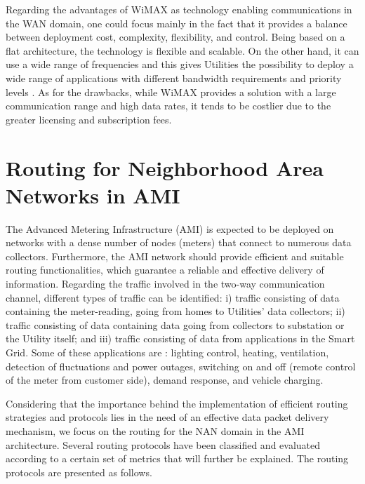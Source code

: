 \documentclass[11pt,draftclsnofoot,onecolumn]{IEEEtran}
\begin{document}
Regarding the advantages of WiMAX as technology enabling communications in the WAN domain, one could focus mainly in the fact that it provides a balance between deployment cost, complexity, flexibility, and control. Being based on a flat architecture, the technology is flexible and scalable. On the other hand, it can use a wide range of frequencies and this gives Utilities the possibility to deploy a wide range of applications with different bandwidth requirements and priority levels \cite{Senza2010}. As for the drawbacks, while WiMAX provides a solution with a large communication range and high data rates, it tends to be costlier due to the greater licensing and subscription fees.


\section{Routing for Neighborhood Area Networks in AMI} \label{routing}

The Advanced Metering Infrastructure (AMI) is expected to be deployed on networks with a dense number of nodes (meters) that connect to numerous data collectors. Furthermore, the AMI network should provide efficient and suitable routing functionalities, which guarantee a reliable and effective delivery of information. Regarding the traffic involved in the two-way communication channel, different types of traffic can be identified: i) traffic consisting of data containing the meter-reading, going from homes to Utilities' data collectors; ii) traffic consisting of data containing data going from collectors to substation or the Utility itself; and iii) traffic consisting of data from applications in the Smart Grid. Some of these applications are \cite{Tan2011}: lighting control, heating, ventilation, detection of fluctuations and power outages, switching on and off (remote control of the meter from customer side), demand response, and vehicle charging. 

Considering that the importance behind the implementation of efficient routing strategies and protocols lies in the need of an effective data packet delivery mechanism, we focus on the routing for the NAN domain in the AMI architecture. %
Several routing protocols have been classified and evaluated according to a certain set of metrics \cite{Sabbah2014} that will further be explained. The routing protocols are presented as follows.
\end{document}
